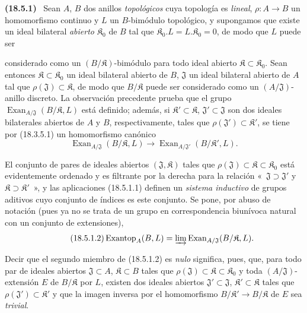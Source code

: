 \documentclass[10pt,oneside]{book}
\makeatletter
\newcommand{\setmanualcurrentlabel}[1]{\def\@currentlabel{#1}}
\newcommand{\oldpage}[2][]{%
  \setcounter{footnote}{0}%
  \marginpar{\scriptsize\textbf{#1}~|~#2}\ignorespaces}
\newenvironment{env}[1][]{\setmanualcurrentlabel{#1}\par\medskip\noindent\textbf{(#1)}\ }{\par}
\makeatother
\begin{document}
\begin{env}[18.5.1]
\label{0.18.5.1-es}
Sean $A$, $B$ dos anillos \emph{topológicos} cuya topología es \emph{lineal},
$\rho:A\to B$ un homomorfismo continuo y $L$ un $B$-bimódulo topológico, y
supongamos que existe un ideal bilateral \emph{abierto} $\mathfrak K_0$ de $B$
tal que $\mathfrak K_0.L=L.\mathfrak K_0=0$, de modo que $L$ puede ser

\oldpage[0\textsubscript{IV-1}]{67}

considerado como un $(B/\mathfrak K)$-bimódulo para todo ideal abierto
$\mathfrak K\subset\mathfrak K_0$. Sean entonces
$\mathfrak K\subset\mathfrak K_0$ un ideal bilateral abierto de $B$,
$\mathfrak J$ un ideal bilateral abierto de $A$ tal que
$\rho(\mathfrak J)\subset\mathfrak K$, de modo que $B/\mathfrak K$ puede ser
considerado como un $(A/\mathfrak J)$-anillo discreto. La observación
precedente prueba que el grupo
$\operatorname{Exan}_{A/\mathfrak J}(B/\mathfrak K,L)$ está definido; además,
si $\mathfrak K'\subset\mathfrak K$, $\mathfrak J'\subset\mathfrak J$ son dos
ideales bilaterales abiertos de $A$ y $B$, respectivamente, tales que
$\rho(\mathfrak J')\subset\mathfrak K'$, se tiene por (18.3.5.1) un
homomorfismo canónico
\begin{equation}
\label{0.18.5.1.1-es}
\tag{18.5.1.1}
  \operatorname{Exan}_{A/\mathfrak J}(B/\mathfrak K,L)
  \longrightarrow
  \operatorname{Exan}_{A/\mathfrak J'}(B/\mathfrak K',L).
\end{equation}

El conjunto de pares de ideales abiertos $(\mathfrak J,\mathfrak K)$ tales que
$\rho(\mathfrak J)\subset\mathfrak K\subset\mathfrak K_0$ está evidentemente
ordenado y es filtrante por la derecha para la relación «~$\mathfrak J\supset\mathfrak J'$
y $\mathfrak K\supset\mathfrak K'$~», y las aplicaciones (18.5.1.1)
definen un \emph{sistema inductivo} de grupos aditivos cuyo conjunto
de índices es este conjunto. Se pone, por abuso de notación (pues ya no se trata
de un grupo en correspondencia biunívoca natural con un conjunto
de extensiones),
\begin{equation}
\label{0.18.5.1.2-es}
\tag{18.5.1.2}
  \operatorname{Exantop}_A(B,L)
  =\varinjlim\operatorname{Exan}_{A/\mathfrak J}(B/\mathfrak K,L).
\end{equation}

Decir que el segundo miembro de (18.5.1.2) es \emph{nulo} significa, pues, que, para
todo par de ideales abiertos $\mathfrak J\subset A$, $\mathfrak K\subset B$
tales que $\rho(\mathfrak J)\subset\mathfrak K\subset\mathfrak K_0$ y toda
$(A/\mathfrak J)$-extensión $E$ de $B/\mathfrak K$ por $L$, existen dos
ideales abiertos $\mathfrak J'\subset\mathfrak J$,
$\mathfrak K'\subset\mathfrak K$ tales que
$\rho(\mathfrak J')\subset\mathfrak K'$ y que la imagen inversa por
el homomorfismo $B/\mathfrak K'\to B/\mathfrak K$ de $E$ sea \emph{trivial}.


\end{env}
\end{document}
